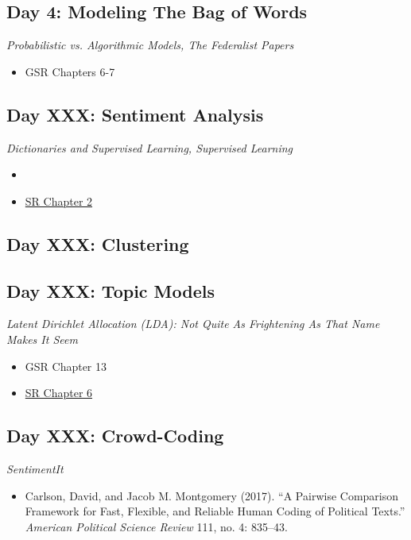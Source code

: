 \documentclass[11pt, letterpaper]{article}
\begin{document}
\subsection*{Day 4: Modeling The Bag of Words}

\textit{Probabilistic vs. Algorithmic Models, The Federalist Papers}

\begin{itemize}
	\item GSR Chapters 6-7
\end{itemize}


\subsection*{Day XXX: Sentiment Analysis}

\textit{Dictionaries and Supervised Learning, Supervised Learning}

\begin{itemize}
	\item \item \href{https://www.tidytextmining.com/sentiment.html}{SR Chapter 2}
\end{itemize}

\subsection*{Day XXX: Clustering}



\subsection*{Day XXX: Topic Models}

\textit{Latent Dirichlet Allocation (LDA): Not Quite As Frightening As That Name Makes It Seem}

\begin{itemize}
	\item GSR Chapter 13
	\item \href{https://www.tidytextmining.com/topicmodeling.html}{SR Chapter 6}
\end{itemize}

\subsection*{Day XXX: Crowd-Coding}

\textit{SentimentIt}

\begin{itemize}
	\item Carlson, David, and Jacob M. Montgomery (2017). ``A Pairwise Comparison Framework for Fast, Flexible, and Reliable Human Coding of Political Texts.'' \textit{American Political Science Review} 111, no. 4: 835–43.
	
\end{itemize}
\end{document}
